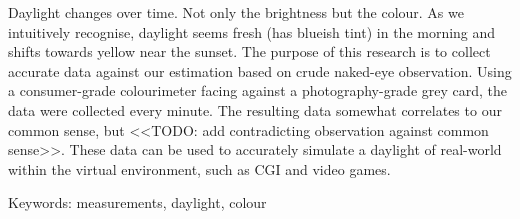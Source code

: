 Daylight changes over time. Not only the brightness but the colour. As we intuitively recognise, daylight seems fresh (has blueish tint) in the morning and shifts towards yellow near the sunset. The purpose of this research is to collect accurate data against our estimation based on crude naked-eye observation. Using a consumer-grade colourimeter facing against a photography-grade grey card, the data were collected every minute. The resulting data somewhat correlates to our common sense, but <<TODO: add contradicting observation against common sense>>. These data can be used to accurately simulate a daylight of real-world within the virtual environment, such as CGI and video games.

Keywords: measurements, daylight, colour
